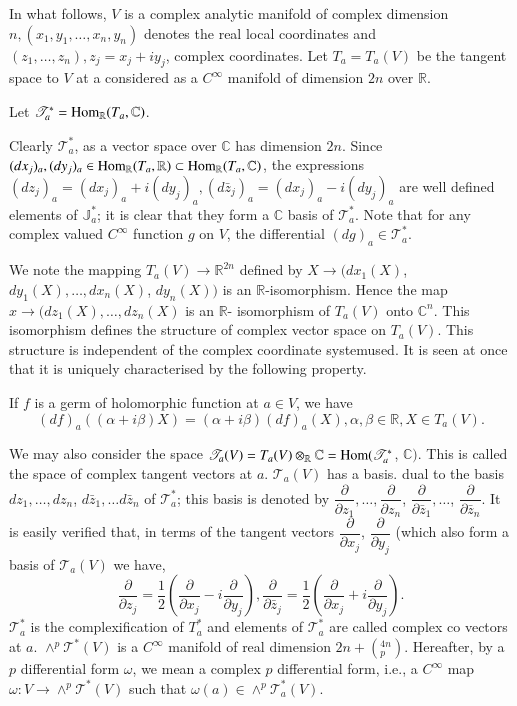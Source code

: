 In what follows, $V$ is a complex analytic manifold of complex
dimension $n, (x_1, y_1, \ldots, x_n, y_n)$ denotes the real local
coordinates and $(z_1,\ldots,z_n), z_j = x_j + iy_j$, complex
coordinates. Let $T_a = T_a (V)$ be the tangent space to $V$ at a
considered as a $C^\infty$ manifold  of dimension $2n$ over
$\mathbb{R}$. 

Let $\mathscr{T}^*_a = \operatorname{Hom}_{\mathbb{R}}(T_a, \mathbb{C})$.

Clearly $\mathscr{T}^*_a$, as a vector space over $\mathbb{C}$ has
dimension $2n$. Since $(dx_j)_a, (dy_j)_a \in \operatorname{Hom}_\mathbb{R}(T_a,
\mathbb{R}) \subset \operatorname{Hom}_\mathbb{R} (T_a, \mathbb{C})$, the
expressions $(dz_j)_a = (dx_j)_a + i(dy_j)_a, (d \bar{z}_j)_a =
(dx_j)_a - i (dy_j)_a$ are well defined elements of $\mathbb{J}^*_a$;
it is clear that they form a $\mathbb{C}$ basis of
$\mathscr{T}^*_a$. Note that for any complex valued $C^\infty$
function $g$ on $V$, the differential $(dg)_a \in \mathscr{T}^*_a$. 

We note the mapping $T_a (V) \to \mathbb{R}^{2n}$ defined by $ X \to
(dx_1 (X)$, $dy_1 (X), \ldots, dx_n (X)$, $dy_n (X))$ is an
$\mathbb{R}$-isomorphism. Hence the map $x \to (dz_1 (X), \ldots, dz_n
(X)$ is an $\mathbb{R}$- isomorphism of $T_a (V)$ onto $\mathbb{C}^n$. This
isomorphism defines the structure of complex vector space on
$T_a(V)$. This structure is independent of the complex coordinate
system\pageoriginale used. It is seen at once that it is uniquely characterised by
the following property. 

If $f$ is a germ of holomorphic function at $a \in V$, we have
$$
(df)_a (( \alpha + i \beta ) X) = (\alpha + i \beta) (df)_a (X),
\alpha, \beta \in \mathbb{R}, X \in T_a (V). 
$$

We may also consider the space $\mathscr{T}_a(V) = T_a (V)
\otimes_\mathbb{R} \mathbb{C} = \operatorname{Hom} (\mathscr{T}^*_a$,
$\mathbb{C})$. This is called the space of complex tangent vectors at
$a$. $\mathscr{T}_a (V)$ has a basis. dual to the basis $dz_1, \ldots,
dz_n$, $d \bar{z}_1, \ldots d \bar{z}_n$ of $\mathscr{T}^*_a$; this
basis is denoted by $\dfrac{\partial}{\partial z_1}, \ldots ,
\dfrac{\partial}{\partial z_n}$, $\dfrac{\partial}{\partial
  \bar{z}_1}, \ldots$, $\dfrac{\partial}{\partial \bar{z}_n}$. It is
easily verified that, in terms of the tangent vectors
$\dfrac{\partial}{\partial x_j}$, $\dfrac{\partial}{\partial y_j}$
(which also form a basis of $\mathscr{T}_a (V)$ we have, 
$$
\dfrac{\partial}{\partial z_j}= \frac{1}{2} \left(\dfrac{\partial}{\partial
  x_j}- i \dfrac{\partial}{\partial y_j}\right),\dfrac{\partial}{\partial 
  \bar{z}_j}= \frac{1}{2} \left(\dfrac{\partial}{\partial x_j} + i
\frac{\partial}{\partial y_j}\right). 
$$
$\mathscr{T}^*_a$ is the complexification of $T^*_a$ and elements of
$\mathscr{T}^*_a$ are called complex co vectors at $a$. $\wedge^p
\mathscr{T}^* (V)$ is a $C^\infty$ manifold of real dimension $2n +
(^{4n}_p)$. Hereafter, by a $p$ differential form $\omega$, we mean a
complex $p$ differential form, i.e., a $C^\infty$ map $\omega : V \to
\wedge^p \mathscr{T}^* (V)$ such that $ \omega (a) \in \wedge^p
\mathscr{T}^*_a (V)$. 

